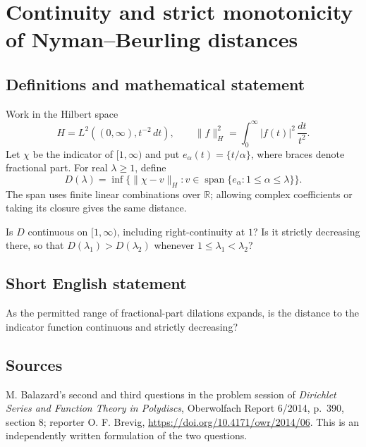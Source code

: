 \documentclass{article}
\begin{document}
\section*{Continuity and strict monotonicity of Nyman--Beurling distances}
\subsection{Definitions and mathematical statement}
Work in the Hilbert space
\[
 H=L^2((0,\infty),t^{-2}\,dt),\qquad
 \|f\|_H^2=\int_0^\infty |f(t)|^2\,\frac{dt}{t^2}.
\]
Let $\chi$ be the indicator of $[1,\infty)$ and put
$e_\alpha(t)=\{t/\alpha\}$, where braces denote fractional part.
For real $\lambda\geq1$, define
\[
 D(\lambda)=\inf\{\|\chi-v\|_H:
       v\in\operatorname{span}\{e_\alpha:1\leq\alpha\leq\lambda\}\}.
\]
The span uses finite linear combinations over $\mathbb R$; allowing complex
coefficients or taking its closure gives the same distance.

Is $D$ continuous on $[1,\infty)$, including right-continuity at $1$?
Is it strictly decreasing there, so that
$D(\lambda_1)>D(\lambda_2)$ whenever $1\leq\lambda_1<\lambda_2$?

\subsection{Short English statement}
As the permitted range of fractional-part dilations expands, is the distance
to the indicator function continuous and strictly decreasing?

\subsection{Sources}
M. Balazard's second and third questions in the problem session of
\emph{Dirichlet Series and Function Theory in Polydiscs}, Oberwolfach
Report 6/2014, p.\ 390, section 8; reporter O. F. Brevig,
\url{https://doi.org/10.4171/owr/2014/06}.
This is an independently written formulation of the two questions.
\end{document}

